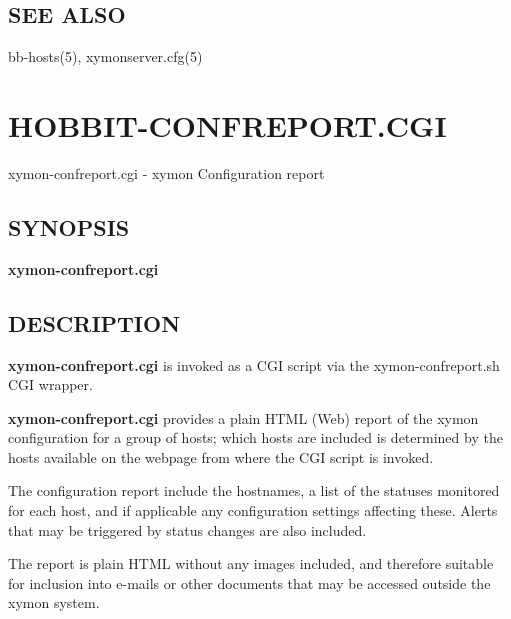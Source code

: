 \subsection{SEE ALSO}
bb-hosts(5), xymonserver.cfg(5) 

 

%
\newpage
\section{HOBBIT-CONFREPORT.CGI}
 xymon-confreport.cgi - xymon Configuration report

 \subsection{SYNOPSIS}
\textbf{xymon-confreport.cgi}

 
\subsection{DESCRIPTION}
\textbf{xymon-confreport.cgi}
 is invoked as a CGI script via the xymon-confreport.sh CGI wrapper. 

 \textbf{xymon-confreport.cgi}
 provides a plain HTML (Web) report of the xymon configuration for a
 group of hosts; which hosts are included is determined by the hosts
 available on the webpage from where the CGI script is invoked. 



  The configuration report include the hostnames, a list of the
  statuses monitored for each host, and if applicable any
  configuration settings affecting these. Alerts that may be triggered
  by status changes are also included. 



  The report is plain HTML without any images included, and therefore
  suitable for inclusion into e-mails or other documents that may be
  accessed outside the xymon system. 



 
